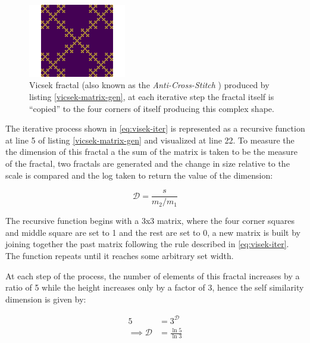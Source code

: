 \documentclass[a4paper,11pt,twoside]{article}
\begin{document}
\begin{figure}
\centering
\includegraphics[width=0.38\textwidth]{media/Vicsek-Fractal.png}
\caption{\label{vicsek-fractal-julia}Vicsek fractal \cite[p. 12]{vicsekFractalGrowthPhenomena1992} (also known as the \emph{Anti-Cross-Stitch} \cite{janwassenaarCantorDust2005}) produced by listing \ref{vicsek-matrix-gen}, at each iterative step the fractal itself is ``copied'' to the four corners of itself producing this complex shape.}
\end{figure}


The iterative process shown in \eqref{eq:visek-iter} is represented as a recursive function at line 5 of listing \ref{vicsek-matrix-gen} and visualized at line 22. To measure the the dimension of this fractal a the sum of the matrix is taken to be the measure of the fractal, two fractals are generated and the change in size relative to the scale is compared and the log taken to return the value of the dimension:

\[
\mathcal{D} = \frac{s}{m_{2}/m_{1}}
\]

The recursive function begins with a 3x3 matrix, where the four corner squares
and middle square are set to 1 and the rest are set to 0, a new matrix is built
by joining together the past matrix following the rule described in \eqref{eq:visek-iter}.
The function repeats until it reaches some arbitrary set width.


At each step of the process, the number of elements of this fractal increases by
a ratio of 5 while the height increases only by a factor of 3, hence the self
similarity dimension is given by:


\begin{align}
5 &= 3^{\mathcal{D}} \nonumber \\
\implies \mathcal{D} &= \frac{\ln 5}{\ln 3} \label{eq:vic-dim-val}
\end{align}
\end{document}
